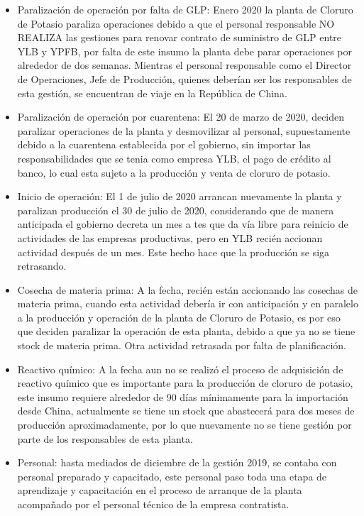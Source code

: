 \documentclass[a4paper, nobind]{templates/ociamthesis}
\begin{document}
\begin{itemize}
\item
  Paralización de operación por falta de GLP: Enero 2020 la planta de Cloruro de Potasio paraliza operaciones debido a que el personal responsable NO REALIZA las gestiones para renovar contrato de suministro de GLP entre YLB y YPFB, por falta de este insumo la planta debe parar operaciones por alrededor de dos semanas. Mientras el personal responsable como el Director de Operaciones, Jefe de Producción, quienes deberían ser los responsables de esta gestión, se encuentran de viaje en la República de China.
\item
  Paralización de operación por cuarentena: El 20 de marzo de 2020, deciden paralizar operaciones de la planta y desmovilizar al personal, supuestamente debido a la cuarentena establecida por el gobierno, sin importar las responsabilidades que se tenia como empresa YLB, el pago de crédito al banco, lo cual esta sujeto a la producción y venta de cloruro de potasio.
\item
  Inicio de operación: El 1 de julio de 2020 arrancan nuevamente la planta y paralizan producción el 30 de julio de 2020, considerando que de manera anticipada el gobierno decreta un mes a tes que da vía libre para reinicio de actividades de las empresas productivas, pero en YLB recién accionan actividad después de un mes. Este hecho hace que la producción se siga retrasando.
\item
  Cosecha de materia prima: A la fecha, recién están accionando las cosechas de materia prima, cuando esta actividad debería ir con anticipación y en paralelo a la producción y operación de la planta de Cloruro de Potasio, es por eso que deciden paralizar la operación de esta planta, debido a que ya no se tiene stock de materia prima. Otra actividad retrasada por falta de planificación.
\item
  Reactivo químico: A la fecha aun no se realizó el proceso de adquisición de reactivo químico que es importante para la producción de cloruro de potasio, este insumo requiere alrededor de 90 días mínimamente para la importación desde China, actualmente se tiene un stock que abastecerá para dos meses de producción aproximadamente, por lo que nuevamente no se tiene gestión por parte de los responsables de esta planta.
\item
  Personal: hasta mediados de diciembre de la gestión 2019, se contaba con personal preparado y capacitado, este personal paso toda una etapa de aprendizaje y capacitación en el proceso de arranque de la planta acompañado por el personal técnico de la empresa contratista.

\end{itemize}
\end{document}
